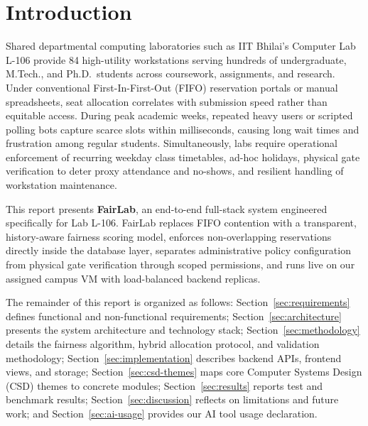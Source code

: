 \documentclass[manuscript,screen,review]{acmart}
\begin{document}

\maketitle

\section{Introduction}
\label{sec:intro}
Shared departmental computing laboratories such as IIT Bhilai's Computer Lab L-106 provide 84 high-utility workstations serving hundreds of undergraduate, M.Tech., and Ph.D.\ students across coursework, assignments, and research. Under conventional First-In-First-Out (FIFO) reservation portals or manual spreadsheets, seat allocation correlates with submission speed rather than equitable access. During peak academic weeks, repeated heavy users or scripted polling bots capture scarce slots within milliseconds, causing long wait times and frustration among regular students. Simultaneously, labs require operational enforcement of recurring weekday class timetables, ad-hoc holidays, physical gate verification to deter proxy attendance and no-shows, and resilient handling of workstation maintenance.

This report presents \textbf{FairLab}, an end-to-end full-stack system engineered specifically for Lab L-106. FairLab replaces FIFO contention with a transparent, history-aware fairness scoring model, enforces non-overlapping reservations directly inside the database layer, separates administrative policy configuration from physical gate verification through scoped permissions, and runs live on our assigned campus VM with load-balanced backend replicas.

The remainder of this report is organized as follows: Section~\ref{sec:requirements} defines functional and non-functional requirements; Section~\ref{sec:architecture} presents the system architecture and technology stack; Section~\ref{sec:methodology} details the fairness algorithm, hybrid allocation protocol, and validation methodology; Section~\ref{sec:implementation} describes backend APIs, frontend views, and storage; Section~\ref{sec:csd-themes} maps core Computer Systems Design (CSD) themes to concrete modules; Section~\ref{sec:results} reports test and benchmark results; Section~\ref{sec:discussion} reflects on limitations and future work; and Section~\ref{sec:ai-usage} provides our AI tool usage declaration.
\end{document}
